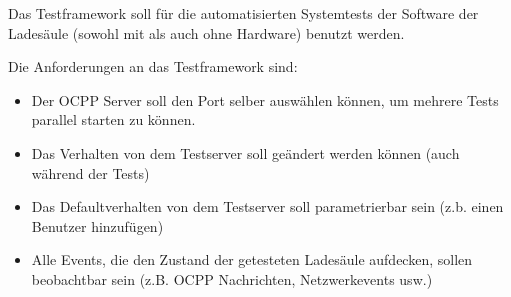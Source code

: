 Das Testframework soll für die automatisierten Systemtests der Software der Ladesäule (sowohl mit als auch ohne Hardware) benutzt werden.

Die Anforderungen an das Testframework sind:
\begin{itemize}
    \item Der OCPP Server soll den Port selber auswählen können, um mehrere Tests parallel starten zu können.
    \item Das Verhalten von dem Testserver soll geändert werden können (auch während der Tests)
    \item Das Defaultverhalten von dem Testserver soll parametrierbar sein (z.b. einen Benutzer hinzufügen)
    \item Alle Events, die den Zustand der getesteten Ladesäule aufdecken, sollen beobachtbar sein (z.B. OCPP Nachrichten, Netzwerkevents usw.)
\end{itemize}